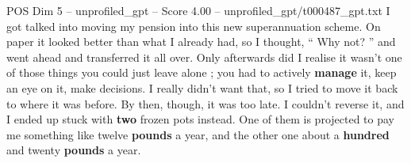 \begin{textsample}{POS Dim 5 – unprofiled\_gpt – Score 4.00 – unprofiled\_gpt/t000487\_gpt.txt}  \label{ex:f5_pos_040}
I got talked into moving my pension into this new superannuation scheme.
On paper it looked better than what I already had, so I thought, “ Why not? ” and went ahead and transferred it all over.
Only afterwards did I realise it wasn't one of those things you could just leave alone ; you had to actively \textbf{manage} it, keep an eye on it, make decisions.
I really didn't want that, so I tried to move it back to where it was before.
By then, though, it was too late.
I couldn't reverse it, and I ended up stuck with \textbf{two} frozen pots instead.
One of them is projected to pay me something like twelve \textbf{pounds} a year, and the other one about a \textbf{hundred} and twenty \textbf{pounds} a year.

\end{textsample}
